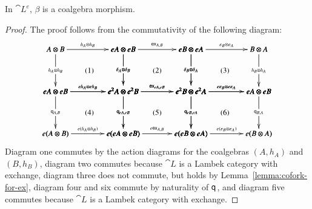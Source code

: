 \begin{lemma}
  \label{lemma:beta-coalgebra-morph}
  In $\cat{L}^e$, $\beta$ is a coalgebra morphism.
\end{lemma}
\begin{proof}
  The proof follows from the commutativity of the following diagram:
  \[
  \small
  \bfig
  \square|amma|<800,500>[
    A \otimes B`
    eA \otimes eB`
    eA \otimes eB`
    e^2A \otimes e^2B;
    h_A \otimes h_B`
    h_A \otimes h_B`
    \delta_A \otimes \delta_B`
    eh_A \otimes eh_B]

  \square(800,0)|amma|<800,500>[
    eA \otimes eB`
    eB \otimes eA`
    e^2A \otimes e^2B`
    e^2B \otimes e^2A;
    \e{A,B}`
    \delta_A \otimes \delta_B`
    \delta_B \otimes \delta_A`
    \e{eA,eB}]

  \square(1600,0)|amma|<800,500>[
    eB \otimes eA`
    B \otimes A`
    e^2B \otimes e^2A`
    eA \otimes eB;
    \varepsilon_B \otimes \varepsilon_A`
    \delta_B \otimes \delta_A`
    h_B \otimes h_A`
    e\varepsilon_B \otimes e\varepsilon_A]

  \square(0,-500)|amma|<800,500>[
    eA \otimes eB`
    e^2A \otimes e^2B`
    e(A \otimes B)`
    e(eA \otimes eB);
    eh_A \otimes eh_B`
    \q{A,B}`
    \q{eA,eB}`
    e(h_A \otimes h_B)]

  \square(800,-500)|amma|<800,500>[
    e^2A \otimes e^2B`
    e^2B \otimes e^2A`
    e(eA \otimes eB)`
    e(eB \otimes eA);
    \e{eA,eB}`
    \q{eA,eB}`
    \q{eB,eA}`
    e\e{A,B}]

  \square(1600,-500)|amma|<800,500>[
    e^2B \otimes e^2A`
    eA \otimes eB`
    e(eB \otimes eA)`
    e(B \otimes A);
    e\varepsilon_B \otimes e\varepsilon_A`
    \q{eB,eA}`
    \q{B,A}`
    e(\varepsilon_B \otimes \varepsilon_A)]

  \place(400,250)[\text{(1)}]
  \place(1200,250)[\text{(2)}]
  \place(2000,250)[\text{(3)}]
  \place(400,-250)[\text{(4)}]
  \place(1200,-250)[\text{(5)}]
  \place(2000,-250)[\text{(6)}]
  \efig 
  \]
  Diagram one commutes by the action diagrams for the coalgebras
  $(A,h_A)$ and $(B,h_B)$, diagram two commutes because $\cat{L}$ is a
  Lambek category with exchange, diagram three does not commute, but
  holds by Lemma~\ref{lemma:cofork-for-ex}, diagram four and six
  commute by naturality of $\mathsf{q}_{}$, and diagram five commutes because
  $\cat{L}$ is a Lambek category with exchange.
\end{proof}

